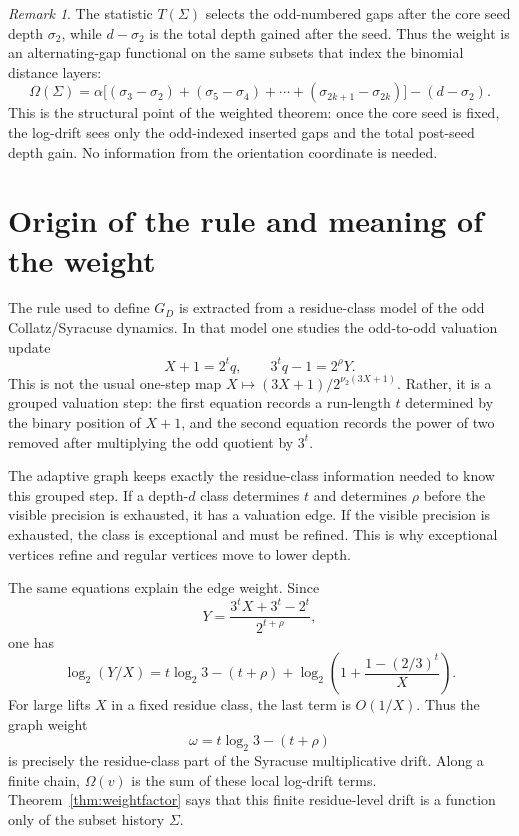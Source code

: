 \documentclass[11pt]{amsart}
\theoremstyle{definition}
\theoremstyle{remark}
\newtheorem{remark}[theorem]{Remark}
\begin{document}
\begin{remark}
The statistic $T(\Sigma)$ selects the odd-numbered gaps after the core seed depth $\sigma_2$, while $d-\sigma_2$ is the total depth gained after the seed.  Thus the weight is an alternating-gap functional on the same subsets that index the binomial distance layers:
\[
\Omega(\Sigma)
=
\alpha\bigl[(\sigma_3-\sigma_2)+(\sigma_5-\sigma_4)+\cdots+(\sigma_{2k+1}-\sigma_{2k})\bigr]
-(d-\sigma_2).
\]
This is the structural point of the weighted theorem: once the core seed is fixed, the log-drift sees only the odd-indexed inserted gaps and the total post-seed depth gain.  No information from the orientation coordinate is needed.
\end{remark}

\section{Origin of the rule and meaning of the weight}\label{sec:collatz}

The rule used to define $G_D$ is extracted from a residue-class model of the odd Collatz/Syracuse dynamics.  In that model one studies the odd-to-odd valuation update
\[
X+1=2^tq,
\qquad
3^tq-1=2^\rho Y.
\]
This is not the usual one-step map $X\mapsto (3X+1)/2^{\nu_2(3X+1)}$.  Rather, it is a grouped valuation step: the first equation records a run-length $t$ determined by the binary position of $X+1$, and the second equation records the power of two removed after multiplying the odd quotient by $3^t$.

The adaptive graph keeps exactly the residue-class information needed to know this grouped step.  If a depth-$d$ class determines $t$ and determines $\rho$ before the visible precision is exhausted, it has a valuation edge.  If the visible precision is exhausted, the class is exceptional and must be refined.  This is why exceptional vertices refine and regular vertices move to lower depth.

The same equations explain the edge weight.  Since
\[
Y=\frac{3^tX+3^t-2^t}{2^{t+\rho}},
\]
one has
\[
\log_2(Y/X)
=
t\log_2 3-(t+\rho)
+
\log_2\!\left(1+\frac{1-(2/3)^t}{X}\right).
\]
For large lifts $X$ in a fixed residue class, the last term is $O(1/X)$.  Thus the graph weight
\[
\omega=t\log_2 3-(t+\rho)
\]
is precisely the residue-class part of the Syracuse multiplicative drift.  Along a finite chain, $\Omega(v)$ is the sum of these local log-drift terms.  Theorem~\ref{thm:weightfactor} says that this finite residue-level drift is a function only of the subset history $\Sigma$.
\end{document}
